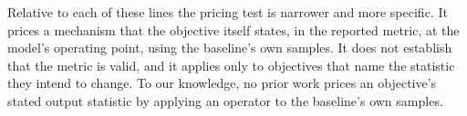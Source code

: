 Relative to each of these lines the pricing test is narrower and more
specific. It prices a mechanism that the objective itself states, in the
reported metric, at the model's operating point, using the baseline's own
samples. It does not establish that the metric is valid, and it applies only
to objectives that name the statistic they intend to change. To our knowledge,
no prior work prices an objective's stated output statistic by applying an
operator to the baseline's own samples.
